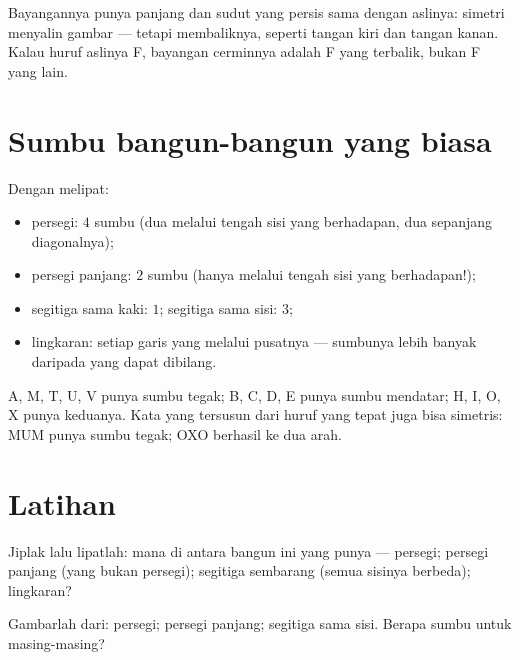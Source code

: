 \begin{example}\label{ex:g4:symmetry:properties}
Bayangannya punya panjang dan sudut yang persis sama dengan aslinya:
simetri menyalin gambar --- tetapi membaliknya, seperti tangan kiri
dan tangan kanan. Kalau huruf aslinya F, bayangan cerminnya adalah F
yang terbalik, bukan F yang lain.
\end{example}

\section{Sumbu bangun-bangun yang biasa}

\begin{example}\label{ex:g4:symmetry:shapes}
Dengan melipat:
\begin{itemize}
  \item persegi: $4$ sumbu (dua melalui tengah sisi yang berhadapan,
        dua sepanjang diagonalnya);
  \item persegi panjang: $2$ sumbu (hanya melalui tengah sisi yang
        berhadapan!);
  \item segitiga sama kaki: $1$; segitiga sama sisi: $3$;
  \item lingkaran: setiap garis yang melalui pusatnya --- sumbunya
        lebih banyak daripada yang dapat dibilang.
\end{itemize}
\end{example}

\begin{example}\label{ex:g4:symmetry:letters}
A, M, T, U, V punya sumbu tegak; B, C, D, E punya sumbu mendatar;
H, I, O, X punya keduanya. Kata yang tersusun dari huruf yang tepat
juga bisa simetris: MUM punya sumbu tegak; OXO berhasil ke dua arah.
\end{example}

\section{Latihan}

\begin{exercise}[$\star$]\label{exo:g4:symmetry:1}
Jiplak lalu lipatlah: mana di antara bangun ini yang punya  --- persegi; persegi panjang (yang bukan persegi); segitiga
sembarang (semua sisinya berbeda); lingkaran?
\end{exercise}

\begin{exercise}[$\star$]\label{exo:g4:symmetry:2}
Gambarlah  dari: persegi; persegi panjang; segitiga
sama sisi. Berapa sumbu untuk masing-masing?
\end{exercise}

